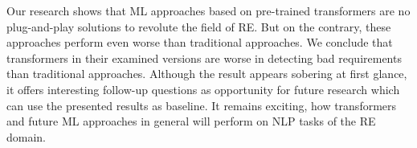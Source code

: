 Our research shows that \ac{ML} approaches based on pre-trained transformers are no plug-and-play solutions to revolute the field of \ac{RE}.
But on the contrary, these approaches perform even worse than traditional approaches.
We conclude that transformers in their examined versions are worse in detecting bad requirements than traditional approaches.
Although the result appears sobering at first glance, it offers interesting follow-up questions as opportunity for future research which can use the presented results as baseline.
It remains exciting, how transformers and future \ac{ML} approaches in general will perform on \ac{NLP} tasks of the \ac{RE} domain.
